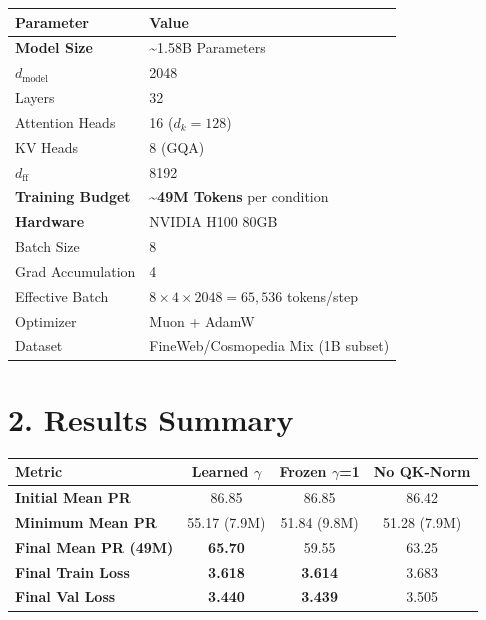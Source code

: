 \documentclass[11pt]{article}
\begin{document}
\begin{table}[h!]
\centering
\begin{tabular}{ll}
\toprule
\textbf{Parameter} & \textbf{Value} \\
\midrule
\textbf{Model Size} & \textasciitilde1.58B Parameters \\
$d_\text{model}$ & 2048 \\
Layers & 32 \\
Attention Heads & 16 ($d_k = 128$) \\
KV Heads & 8 (GQA) \\
$d_\text{ff}$ & 8192 \\
\textbf{Training Budget} & \textbf{\textasciitilde49M Tokens} per condition \\
\textbf{Hardware} & NVIDIA H100 80GB \\
Batch Size & 8 \\
Grad Accumulation & 4 \\
Effective Batch & $8 \times 4 \times 2048 = 65{,}536$ tokens/step \\
Optimizer & Muon + AdamW \\
Dataset & FineWeb/Cosmopedia Mix (1B subset) \\
\bottomrule
\end{tabular}
\end{table}

\section{2. Results Summary}

\begin{table}[h!]
\centering
\begin{tabular}{lccc}
\toprule
\textbf{Metric} & \textbf{Learned $\gamma$} & \textbf{Frozen $\gamma$=1} & \textbf{No QK-Norm} \\
\midrule
\textbf{Initial Mean PR} & 86.85 & 86.85 & 86.42 \\
\textbf{Minimum Mean PR} & 55.17 (7.9M) & 51.84 (9.8M) & 51.28 (7.9M) \\
\textbf{Final Mean PR (49M)} & \textbf{65.70} & 59.55 & 63.25 \\
\textbf{Final Train Loss} & \textbf{3.618} & \textbf{3.614} & 3.683 \\
\textbf{Final Val Loss} & \textbf{3.440} & \textbf{3.439} & 3.505 \\
\bottomrule
\end{tabular}
\end{table}
\end{document}
